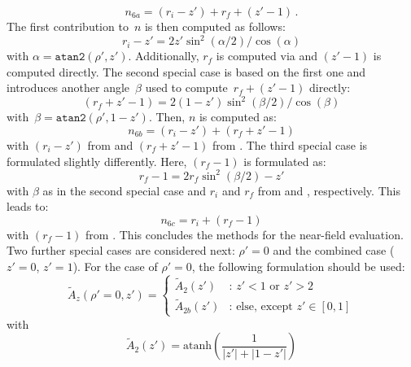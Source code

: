 \begin{equation}
  n_{6a} = (r_i - z') + r_f + (z'-1) \, .
\end{equation}
The first contribution to~$n$ is then computed as follows:
\begin{equation}
  r_i - z' = 2 z' \sin^2(\alpha/2) / \cos(\alpha) \label{eqn:ri_zp}
\end{equation}
with $\alpha = \texttt{atan2}(\rho', z')$.
Additionally, $r_f$ is computed via  and $(z'-1)$ is computed directly.
The second special case is based on the first one and introduces another angle~$\beta$
used to compute~$r_f + (z'-1)$ directly:
\begin{equation}
  (r_f + z' - 1) = 2 (1 - z') \sin^2(\beta/2) / \cos(\beta) \label{eqn:rf_zp_1}
\end{equation}
with~$\beta = \texttt{atan2}(\rho', 1-z')$.
Then, $n$ is computed as:
\begin{equation}
  n_{6b} = (r_i - z') + (r_f + z'-1)
\end{equation}
with $(r_i - z')$ from  and $(r_f + z' - 1)$ from .
The third special case is formulated slightly differently.
Here, $(r_f-1)$ is formulated as:
\begin{equation}
  r_f - 1 = 2 r_f \sin^2(\beta/2) - z' \label{eqn:rf_1}
\end{equation}
with $\beta$ as in the second special case
and $r_i$ and $r_f$ from  and , respectively.
This leads to:
\begin{equation}
  n_{6c} = r_i + (r_f - 1)
\end{equation}
with $(r_f - 1)$ from .
This concludes the methods for the near-field evaluation.
Two further special cases are considered next: $\rho' = 0$ and the combined case ($z'=0$, $z'=1$).
For the case of $\rho'=0$, the following formulation should be used:
\begin{equation}
  \tilde{A}_z (\rho'=0, z')
  = \begin{cases}
      \tilde{A}_2(z')  &:\, z' < 1 \textrm{ or } z' > 2 \\
      \tilde{A}_{2b}(z') &:\, \textrm{else, except } z' \in [0, 1]
    \end{cases}
\end{equation}
with
\begin{equation}
  \tilde{A}_2(z') = \textrm{atanh}\left( \frac{1}{|z'| + |1 - z'|} \right)
\end{equation}
